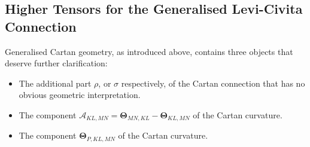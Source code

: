 \documentclass[11pt,a4paper]{article}
\numberwithin{equation}{section}
\begin{document}
\subsection{Higher Tensors for the Generalised Levi-Civita Connection} \label{chap:HigherTensors}
Generalised Cartan geometry, as introduced above, contains three objects that deserve further clarification:
\begin{itemize}
    \item The additional part $\rho$, or $\sigma$ respectively, of the Cartan connection that has no obvious geometric interpretation.
    \item The component $\mathcal{A}_{KL,MN} = \mathbf{\Theta}_{MN,KL} - \mathbf{\Theta}_{KL,MN}$ of the Cartan curvature.
    \item The component $\mathbf{\Theta}_{P,KL,MN}$ of the Cartan curvature. 
\end{itemize}
\end{document}
